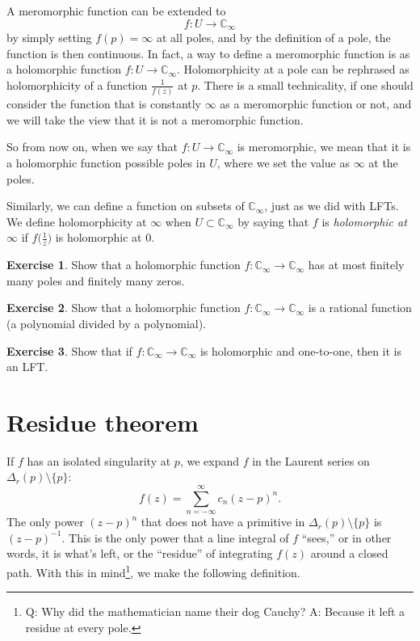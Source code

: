 \documentclass[12pt,openany]{book}
\newcommand{\C}{{\mathbb{C}}}
\newcommand{\myindex}[1]{#1\index{#1}}
\theoremstyle{plain}
\theoremstyle{remark}
\theoremstyle{definition}
\newenvironment{exbox}{%
    \def\FrameCommand{\vrule width 1pt \relax\hspace {10pt}}%
    \MakeFramed {\advance \hsize -\width \FrameRestore }%
}{%
    \endMakeFramed
}
\theoremstyle{exercise}
\newtheorem{exercise}{Exercise}[section]
\theoremstyle{example}
\begin{document}
A meromorphic function can be extended to
\begin{equation*}
f \colon U \to \C_{\infty}
\end{equation*}
by simply setting $f(p) = \infty$ at all poles, and by the definition of a
pole, the function is then continuous.  In fact, a way to define
a meromorphic function is as a holomorphic function
$f \colon U \to \C_{\infty}$.  Holomorphicity at a pole can be
rephrased as holomorphicity of a function $\frac{1}{f(z)}$ at $p$.
There is a small technicality, if one should consider the function
that is constantly $\infty$ as a meromorphic function or not, and we
will take the view that it is not a meromorphic function.

So from now on, when we say that $f \colon U \to \C_\infty$ is
meromorphic, we mean that it is a holomorphic function possible
poles in $U$, where we set the value as $\infty$ at the poles.

Similarly, we can define a function on subsets of $\C_\infty$, just as
we did with LFTs.
We define holomorphicity at $\infty$ when $U \subset
\C_\infty$ by saying that $f$ is \emph{\myindex{holomorphic at $\infty$}}
if $f\bigl(\frac{1}{z}\bigr)$ is holomorphic at $0$.

\begin{exbox}
\begin{exercise}
Show that a holomorphic function $f \colon \C_\infty \to \C_\infty$ has
at most finitely many poles and finitely many zeros.
\end{exercise}

\begin{exercise}
Show that a holomorphic function $f \colon \C_\infty \to \C_\infty$ is a
rational function (a polynomial divided by a polynomial).
\end{exercise}

\begin{exercise}
Show that if $f \colon \C_\infty \to \C_\infty$ is holomorphic and
one-to-one, then it is an LFT.
\end{exercise}
\end{exbox}


\section{Residue theorem}

If $f$ has an isolated singularity at $p$,
we expand
$f$ in the Laurent series on $\Delta_r(p) \setminus \{ p \}$:
\begin{equation*}
f(z) = \sum_{n=-\infty}^\infty c_n {(z-p)}^n .
\end{equation*}
The only power ${(z-p)}^n$ that does not have a primitive in
$\Delta_r(p) \setminus \{ p \}$ is ${(z-p)}^{-1}$.  This is the only power
that a line integral of $f$ ``sees,'' or in other words, it is
what's left, or the ``residue'' of integrating $f(z)$ around a closed path.
With this in mind\footnote{%
Q: Why did the mathematician name their dog Cauchy?
A: Because it left a residue at every pole.},
we make the following definition.
\end{document}

